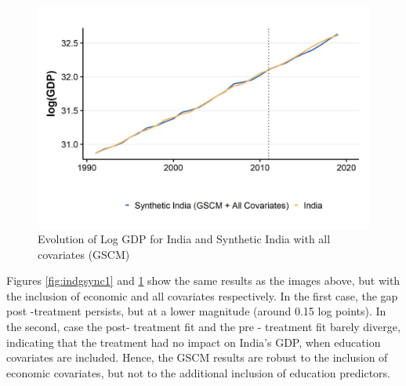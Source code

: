 \documentclass[12pt,nobind, a4paper]{reedthesis}
\begin{document}
 \begin{figure}

 {\centering \includegraphics[width=1\linewidth]{figure/indiagsynthc1} 

 }

 \caption{Evolution of Log GDP for India and Synthetic India with all covariates (GSCM)}\label{fig:indgsync2}
 \end{figure}
 Figures \ref{fig:indgsync1} and \ref{fig:indgsync2} show the same results as the images above, but with the inclusion of economic and all covariates respectively. In the first case, the gap post -treatment persists, but at a lower magnitude (around 0.15 log points). In the second, case the post- treatment fit and the pre - treatment fit barely diverge, indicating that the treatment had no impact on India's GDP, when education covariates are included. Hence, the GSCM results are robust to the inclusion of economic covariates, but not to the additional inclusion of education predictors.
 \linebreak
\end{document}
